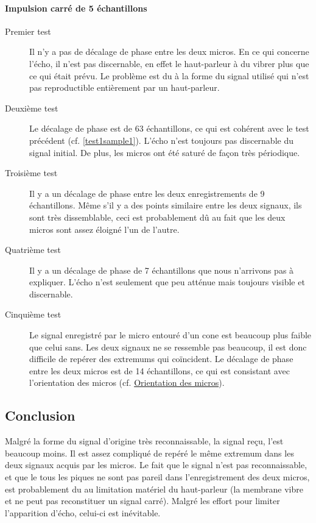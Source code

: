 \documentclass[12pt,a4paper]{report}
\begin{document}
\paragraph{Impulsion carré de 5 échantillons}
\begin{description}
\item[Premier test] Il n'y a pas de décalage de phase entre les deux micros. En ce qui concerne l'écho, il n'est pas discernable, en effet le haut-parleur à du vibrer plus que ce qui était prévu. Le problème est du à la forme du signal utilisé qui n'est pas reproductible entièrement par un haut-parleur.
\item[Deuxième test] Le décalage de phase est de 63 échantillons, ce qui est cohérent avec le test précédent (cf. \ref{test1sample1}). L'écho n'est toujours pas discernable du signal initial. De plus, les micros ont été saturé de façon très périodique.
\item[Troisième test]Il y a un décalage de phase entre les deux enregistrements de 9 échantillons. Même s'il y a des points similaire entre les deux signaux, ils sont très dissemblable, ceci est probablement dû au fait que les deux micros sont assez éloigné l'un de l'autre.
\item[Quatrième test] Il y a un décalage de phase de 7 échantillons que nous n'arrivons pas à expliquer. L'écho n'est seulement que peu atténue mais toujours visible et discernable.
\item[Cinquième test] Le signal enregistré par le micro entouré d'un cone est beaucoup plus faible que celui sans. Les deux signaux ne se ressemble pas beaucoup, il est donc difficile de repérer des extremums qui coïncident.  Le décalage de phase entre les deux micros est de 14 échantillons, ce qui est consistant avec l'orientation des micros (cf. \hyperref[orientation_micro]{Orientation des micros}).
 \end{description}

\subsection{Conclusion}
Malgré la forme du signal d'origine très reconnaissable, la signal reçu, l'est beaucoup moins. Il est assez compliqué de repéré le même extremum dans les deux signaux acquis par les micros. Le fait que le signal n'est pas reconnaissable, et que le tous les piques ne sont pas pareil dans l'enregistrement des deux micros, est probablement du au limitation matériel du haut-parleur (la membrane vibre et ne peut pas reconstituer un signal carré). Malgré les effort pour limiter l'apparition d'écho, celui-ci est inévitable.
	
\end{document}
